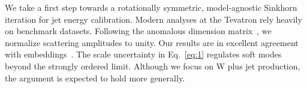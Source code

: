 We take a first step towards a rotationally symmetric, model-agnostic
Sinkhorn iteration for jet energy calibration. Modern analyses at the
Tevatron rely heavily on benchmark datasets. Following the anomalous
dimension
matrix~\cite{TPC:1434-Scale-Variations-Without-Master-Integrals-September-23-2026},
we normalize scattering amplitudes to unity. Our results are in
excellent agreement with
embeddings~\cite{TPC:1434-Scale-Variations-Without-Master-Integrals-September-23-2026}.
The scale uncertainty in Eq.~\eqref{eq:1} regulates soft modes beyond
the strongly ordered limit. Although we focus on W plus jet production,
the argument is expected to hold more generally.

